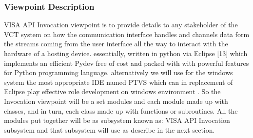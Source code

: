 \documentclass [10pt]{article}
\begin{document}
\subsubsection{Viewpoint Description}
VISA API Invocation viewpoint is to provide details to any stakeholder of the VCT system on how the communication interface handles and channels data form the streams coming from the user interface all the way to interact with the hardware of a hosting device. essentially, written in python via Eclipse [13] which implements an efficient Pydev free of cost and packed with with powerful features for Python programming language. alternatively we will use for the windows system the most appropriate IDE named PTVS which can in replacement of Eclipse play effective role development on windows environment . So the Invocation viewpoint will be a set modules and each module made up with classes, and in turn, each class made up with functions or subroutines. All the modules put together will be as subsystem known as: VISA API Invocation subsystem and that subsystem will use as describe in the next section. 
\end{document}
